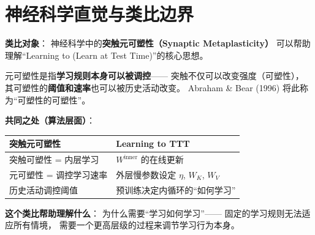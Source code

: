 \section{神经科学直觉与类比边界}
\label{sec:l2l_neuro}

\begin{neurosciencebox}[title=神经科学直觉：突触元可塑性——``学习如何学习''的生物对应]

\textbf{类比对象}：
神经科学中的\textbf{突触元可塑性（Synaptic Metaplasticity）}
可以帮助理解``Learning to (Learn at Test Time)''的核心思想。

元可塑性是指\textbf{学习规则本身可以被调控}——
突触不仅可以改变强度（可塑性），
其可塑性的\textbf{阈值和速率}也可以被历史活动改变。
Abraham \& Bear (1996) 将此称为``可塑性的可塑性''。

\textbf{共同之处（算法层面）}：
\begin{center}
\begin{tabular}{p{5.5cm} p{5.5cm}}
\toprule
\textbf{突触元可塑性} & \textbf{Learning to TTT} \\
\midrule
突触可塑性 = 内层学习 & $W^{\text{inner}}$ 的在线更新 \\
元可塑性 = 调控学习速率 & 外层慢参数设定 $\eta$, $W_K$, $W_V$ \\
历史活动调控阈值 & 预训练决定内循环的``如何学习'' \\
\bottomrule
\end{tabular}
\end{center}

\textbf{这个类比帮助理解什么}：
为什么需要``学习如何学习''——
固定的学习规则无法适应所有情境，
需要一个更高层级的过程来调节学习行为本身。

\end{neurosciencebox}

